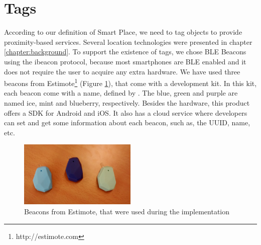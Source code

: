 \section{Tags}
\label{sec:implementation_tags}
According to our definition of Smart Place, we need to tag objects to provide proximity-based services.
Several location technologies were presented in chapter \ref{chapter:background}.
To support the existence of tags, we chose \gls{BLE} Beacons using the ibeacon protocol, because most smartphones are \gls{BLE} enabled and it does not require the user to acquire any extra hardware.
We have used three beacons from Estimote\footnote{http://estimote.com}
(Figure \ref{fig:estimote}), that come with a development kit.
In this kit, each beacon come with a name, defined by .
The blue, green and purple are named ice, mint and blueberry, respectively.
Besides the hardware, this product offers a \gls{SDK} for Android and
iOS. It also has a cloud service where developers can set and get
some information about each beacon, such as, the \gls{UUID}, name, etc.

\begin{figure}[!ht]
  \centering
    \includegraphics[width=0.5\textwidth, keepaspectratio]{images/estimote}
    \caption[Estimote beacons]{Beacons from Estimote, that were used during the implementation}
    \label{fig:estimote}
\end{figure}

